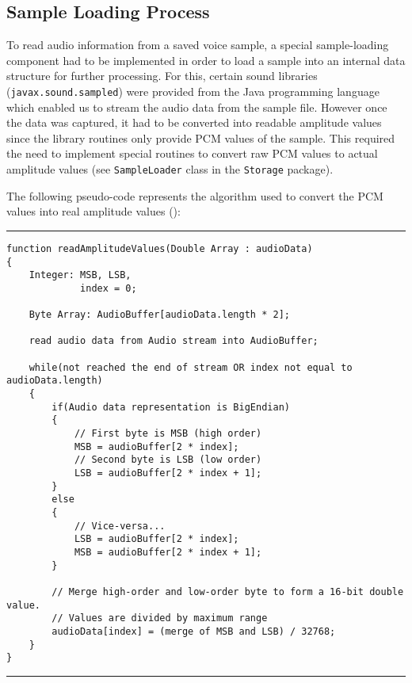 \subsection{Sample Loading Process}

To read audio information from a saved voice sample, a special sample-loading
component had to be implemented in order to load a sample into an internal data
structure for further processing. For this, certain sound libraries (\verb+javax.sound.sampled+)
were provided from the Java programming language which enabled us to
stream the audio data from the sample file. However once the data was captured, it
had to be converted into readable amplitude values since the library routines only
provide PCM values of the sample. This required the need to implement special
routines to convert raw PCM values to actual amplitude values (see \verb+SampleLoader+ class in
the \verb+Storage+ package).

\clearpage
The following pseudo-code represents the algorithm used to convert the PCM values
into real amplitude values (\cite{javasun}):

\vspace{15pt}
\hrule
\begin{verbatim}
function readAmplitudeValues(Double Array : audioData)
{
    Integer: MSB, LSB,
             index = 0;

    Byte Array: AudioBuffer[audioData.length * 2];

    read audio data from Audio stream into AudioBuffer;

    while(not reached the end of stream OR index not equal to audioData.length)
    {
        if(Audio data representation is BigEndian)
        {
            // First byte is MSB (high order)
            MSB = audioBuffer[2 * index];
            // Second byte is LSB (low order)
            LSB = audioBuffer[2 * index + 1];
        }
        else
        {
            // Vice-versa...
            LSB = audioBuffer[2 * index];
            MSB = audioBuffer[2 * index + 1];
        }

        // Merge high-order and low-order byte to form a 16-bit double value.
        // Values are divided by maximum range
        audioData[index] = (merge of MSB and LSB) / 32768;
    }
}
\end{verbatim}
\hrule
\vspace{15pt}


